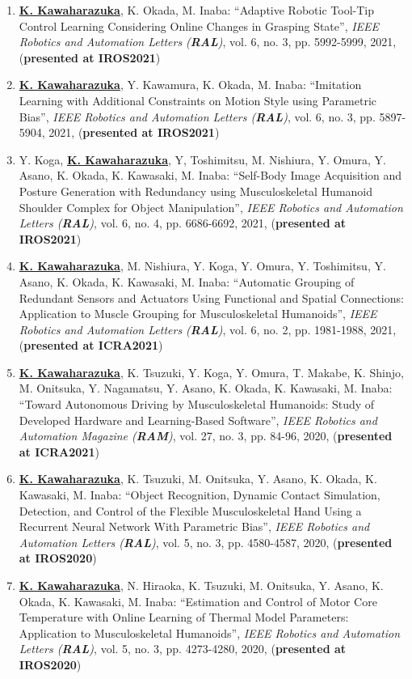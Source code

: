 \documentclass[letterpaper]{article}
\begin{document}
\begin{enumerate}
\item \underline{\textbf{K. Kawaharazuka}}, K. Okada, M. Inaba: ``Adaptive Robotic Tool-Tip Control Learning Considering Online Changes in Grasping State'', \textit{IEEE Robotics and Automation Letters (\textit{\textbf{RAL}})}, vol. 6, no. 3, pp. 5992-5999, 2021, (\textbf{presented at IROS2021})
\item \underline{\textbf{K. Kawaharazuka}}, Y. Kawamura, K. Okada, M. Inaba: ``Imitation Learning with Additional Constraints on Motion Style using Parametric Bias'', \textit{IEEE Robotics and Automation Letters (\textit{\textbf{RAL}})}, vol. 6, no. 3, pp. 5897-5904, 2021, (\textbf{presented at IROS2021})
\item Y. Koga, \underline{\textbf{K. Kawaharazuka}}, Y, Toshimitsu, M. Nishiura, Y. Omura, Y. Asano, K. Okada, K. Kawasaki, M. Inaba: ``Self-Body Image Acquisition and Posture Generation with Redundancy using Musculoskeletal Humanoid Shoulder Complex for Object Manipulation'', \textit{IEEE Robotics and Automation Letters (\textit{\textbf{RAL}})}, vol. 6, no. 4, pp. 6686-6692, 2021, (\textbf{presented at IROS2021})
\item \underline{\textbf{K. Kawaharazuka}}, M. Nishiura, Y. Koga, Y. Omura, Y. Toshimitsu, Y. Asano, K. Okada, K. Kawasaki, M. Inaba: ``Automatic Grouping of Redundant Sensors and Actuators Using Functional and Spatial Connections: Application to Muscle Grouping for Musculoskeletal Humanoids'', \textit{IEEE Robotics and Automation Letters (\textit{\textbf{RAL}})}, vol. 6, no. 2, pp. 1981-1988, 2021, (\textbf{presented at ICRA2021})
\item \underline{\textbf{K. Kawaharazuka}}, K. Tsuzuki, Y. Koga, Y. Omura, T. Makabe, K. Shinjo, M. Onitsuka, Y. Nagamatsu, Y. Asano, K. Okada, K. Kawasaki, M. Inaba: ``Toward Autonomous Driving by Musculoskeletal Humanoids: Study of Developed Hardware and Learning-Based Software'', \textit{IEEE Robotics and Automation Magazine (\textit{\textbf{RAM}})}, vol. 27, no. 3, pp. 84-96, 2020, (\textbf{presented at ICRA2021})
\item \underline{\textbf{K. Kawaharazuka}}, K. Tsuzuki, M. Onitsuka, Y. Asano, K. Okada, K. Kawasaki, M. Inaba: ``Object Recognition, Dynamic Contact Simulation, Detection, and Control of the Flexible Musculoskeletal Hand Using a Recurrent Neural Network With Parametric Bias'', \textit{IEEE Robotics and Automation Letters (\textit{\textbf{RAL}})}, vol. 5, no. 3, pp. 4580-4587, 2020, (\textbf{presented at IROS2020})
\item \underline{\textbf{K. Kawaharazuka}}, N. Hiraoka, K. Tsuzuki, M. Onitsuka, Y. Asano, K. Okada, K. Kawasaki, M. Inaba: ``Estimation and Control of Motor Core Temperature with Online Learning of Thermal Model Parameters: Application to Musculoskeletal Humanoids'', \textit{IEEE Robotics and Automation Letters (\textit{\textbf{RAL}})}, vol. 5, no. 3, pp. 4273-4280, 2020, (\textbf{presented at IROS2020})

\end{enumerate}
\end{document}
